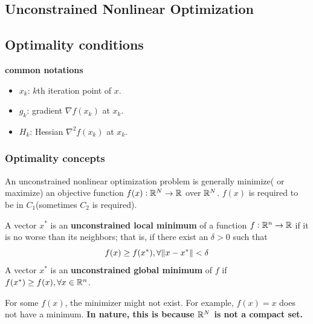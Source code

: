 \begin{refsection}
\startcontents[chapters]	
\chapter{Unconstrained Nonlinear Optimization}\label{ch:unconstrained-mathematical-optimization}
\section{Optimality conditions}\label{ch:unconstrained-mathematical-optimization:sec:optimality-conditions}
\begin{mdframed}
	\textbf{common notations}
	\begin{itemize}
		\item $x_k$: $k$th iteration point of $x$.
		\item $g_k$:  gradient $\nabla f(x_k)$ at $x_k$.
		\item $H_k$: Hessian $\nabla^2 f(x_k)$ at $x_k$.
	\end{itemize}
\end{mdframed}

\subsection{Optimality concepts}
\begin{definition}
An unconstrained nonlinear optimization problem is generally minimize( or maximize) an objective function $f(x):\mathbb{R}^N\to \mathbb{R}$ over $\mathbb{R}^N$. $f(x)$ is required to be in $C_1$(sometimes $C_2$ is required). 	
\end{definition}



\begin{definition}
\cite[5]{bertsekas2016nonlinear} A vector $x^*$ is an \textbf{unconstrained local minimum} of a function $f:\mathbb{R}^n \to \mathbb{R}$ if it is no worse than its neighbors; that is, if there exist an $\delta > 0$ such that 
$$f(x) \geq f(x^*), \forall \norm{x-x^*}<\delta$$
A vector $x^*$ is an \textbf{unconstrained global minimum} of $f$ if
$f(x^*) \geq f(x),\forall x\in \mathbb{R}^n$.
\end{definition}

\begin{remark}
	For some $f(x)$, the minimizer might not exist. For example, $f(x) = x$ does not have a minimum. \textbf{In nature, this is because $\mathbb{R}^N$ is not a compact set.}
\end{remark}


\end{refsection}
